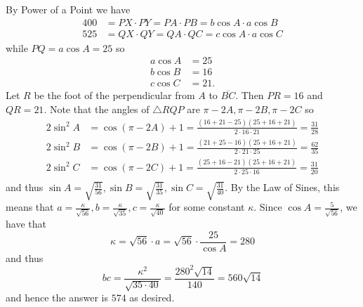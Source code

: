 By Power of a Point we have
\begin{align*}
	400&=PX\cdot PY=PA\cdot PB=b\cos A\cdot a\cos B\\
	525&=QX\cdot QY=QA\cdot QC=c\cos A\cdot a\cos C
\end{align*}
while $PQ=a\cos A=25$ so
\begin{align*}
	a\cos A&=25\\
	b\cos B&=16\\
	c\cos C&=21.
\end{align*}
Let $R$ be the foot of the perpendicular from $A$ to $\overline{BC}$. Then $PR=16$ and $QR=21$. Note that the angles of $\triangle{RQP}$ are $\pi-2A,\pi-2B,\pi-2C$ so
\begin{align*}
	2\sin^2A&=\cos\left(\pi-2A\right)+1=\frac{\left(16+21-25\right)\left(25+16+21\right)}{2\cdot16\cdot21}=\frac{31}{28}\\
	2\sin^2B&=\cos\left(\pi-2B\right)+1=\frac{\left(21+25-16\right)\left(25+16+21\right)}{2\cdot21\cdot25}=\frac{62}{35}\\
	2\sin^2C&=\cos\left(\pi-2C\right)+1=\frac{\left(25+16-21\right)\left(25+16+21\right)}{2\cdot25\cdot16}=\frac{31}{20}\\
\end{align*}
and thus $\sin A=\sqrt{\frac{31}{56}},\sin B=\sqrt{\frac{31}{35}},\sin C=\sqrt{\frac{31}{40}}$. By the Law of Sines, this means that $a=\frac{\kappa}{\sqrt{56}},b=\frac{\kappa}{\sqrt{35}},c=\frac{\kappa}{\sqrt{40}}$ for some constant $\kappa$. Since $\cos A=\frac{5}{\sqrt{56}}$, we have that \[\kappa=\sqrt{56}\cdot a=\sqrt{56}\cdot\frac{25}{\cos A}=280\] and thus \[bc=\frac{\kappa^2}{\sqrt{35\cdot40}}=\frac{280^2\sqrt{14}}{140}=560\sqrt{14}\] and hence the answer is $\boxed{574}$ as desired.